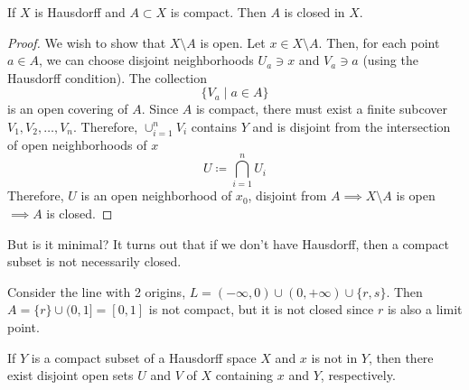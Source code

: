   \begin{theorem}
    If $X$ is Hausdorff and $A \subset X$ is compact. Then $A$ is closed in $X$. 
  \end{theorem}
  \begin{proof}
    We wish to show that $X \setminus A$ is open. Let $x \in X \setminus A$. Then, for each point $a \in A$, we can choose disjoint neighborhoods $U_a \ni x$ and $V_a \ni a$ (using the Hausdorff condition). The collection 
    \begin{equation}
      \{V_a \mid a \in A\}
    \end{equation}
    is an open covering of $A$. Since $A$ is compact, there must exist a finite subcover $V_1, V_2, \ldots , V_n$. Therefore, $\cup_{i=1}^{n} V_i$ contains $Y$ and is disjoint from the intersection of open neighborhoods of $x$
    \begin{equation}
      U \coloneqq \bigcap_{i=1}^n U_i
    \end{equation}
    Therefore, $U$ is an open neighborhood of $x_0$, disjoint from $A \implies X \setminus A$ is open $\implies A$ is closed.
  \end{proof}

  But is it minimal? It turns out that if we don't have Hausdorff, then a compact subset is not necessarily closed. 

  \begin{example}
    Consider the line with 2 origins, $L = (-\infty, 0) \cup (0, +\infty) \cup \{r, s\}$. Then $A = \{r\} \cup (0, 1] = [0, 1]$ is not compact, but it is not closed since $r$ is also a limit point. 
  \end{example}

  \begin{lemma}
    If $Y$ is a compact subset of a Hausdorff space $X$ and $x$ is not in $Y$, then there exist disjoint open sets $U$ and $V$ of $X$ containing $x$ and $Y$, respectively. 

    \begin{figure}[H]
      \centering 
      \label{fig:hausdorff_compact}
    \end{figure}
  \end{lemma}

